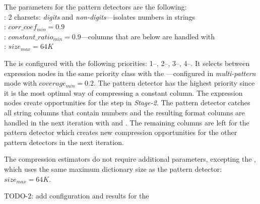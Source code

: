 The parameters for the pattern detectors are the following:\\
: 2 charsets: \textit{digits} and \textit{non-digits}---isolates numbers in strings\\
: \(corr\_coef_{min} = 0.9\)\\
: \(constant\_ratio_{min} = 0.9\)---columns that are below are handled with \\
: \(size_{max} = 64K\)

The  is configured with the following priorities: 1--, 2--, 3--, 4--.
It selects between expression nodes in the same priority class with the ---configured in \textit{multi-pattern} mode with \(coverage_{min} = 0.2\). The  pattern detector has the highest priority since it is the most optimal way of compressing a constant column. The  expression nodes create opportunities for the   step in \textit{Stage-2}. The  pattern detector catches all string columns that contain numbers and the resulting format columns are handled in the next iteration with  and . The remaining columns are left for the  pattern detector which creates new compression opportunities for the other pattern detectors in the next iteration.

The compression estimators do not require additional parameters, excepting the , which uses the same maximum dictionary size as the  pattern detector: \(size_{max} = 64K\).

TODO-2: add configuration and results for the 

